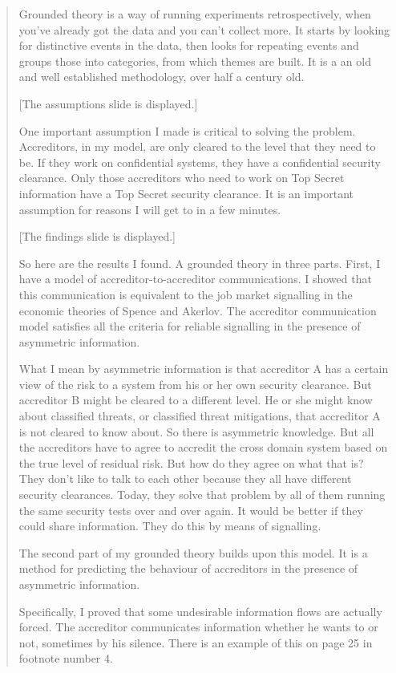\begin{quotation}
Grounded theory is a way of running experiments retrospectively, when you've already got the data
and you can't collect more.  It starts by looking for distinctive events in the data, then looks
for repeating events and groups those into categories, from which themes are built.  It is a an old
and well established methodology, over half a century old.

[The assumptions slide is displayed.]

One important assumption I made is critical to solving the problem.  Accreditors, in my model, are
only cleared to the level that they need to be.  If they work on confidential systems, they have a
confidential security clearance.  Only those accreditors who need to work on Top Secret information
have a Top Secret security clearance.  It is an important assumption for reasons I will get to in a
few minutes.

[The findings slide is displayed.]

So here are the results I found.  A grounded theory in three parts.  First, I have a model of
accreditor-to-accreditor communications.  I showed that this communication is equivalent to the job
market signalling in the economic theories of Spence and Akerlov.  The accreditor communication
model satisfies all the criteria for reliable signalling in the presence of asymmetric information.

What I mean by asymmetric information is that accreditor A has a certain view of the risk to a
system from his or her own security clearance.  But accreditor B might be cleared to a different
level.  He or she might know about classified threats, or classified threat mitigations, that
accreditor A is not cleared to know about.  So there is asymmetric knowledge.  But all the
accreditors have to agree to accredit the cross domain system based on the true level of residual
risk.  But how do they agree on what that is?  They don't like to talk to each other because they
all have different security clearances.  Today, they solve that problem by all of them running the
same security tests over and over again.  It would be better if they could share information.  They
do this by means of signalling.

The second part of my grounded theory builds upon this model.  It is a method for predicting the
behaviour of accreditors in the presence of asymmetric information.

Specifically, I proved that some undesirable information flows are actually forced.  The accreditor
communicates information whether he wants to or not, sometimes by his silence.  There is an example
of this on page 25 in footnote number 4.


\end{quotation}
